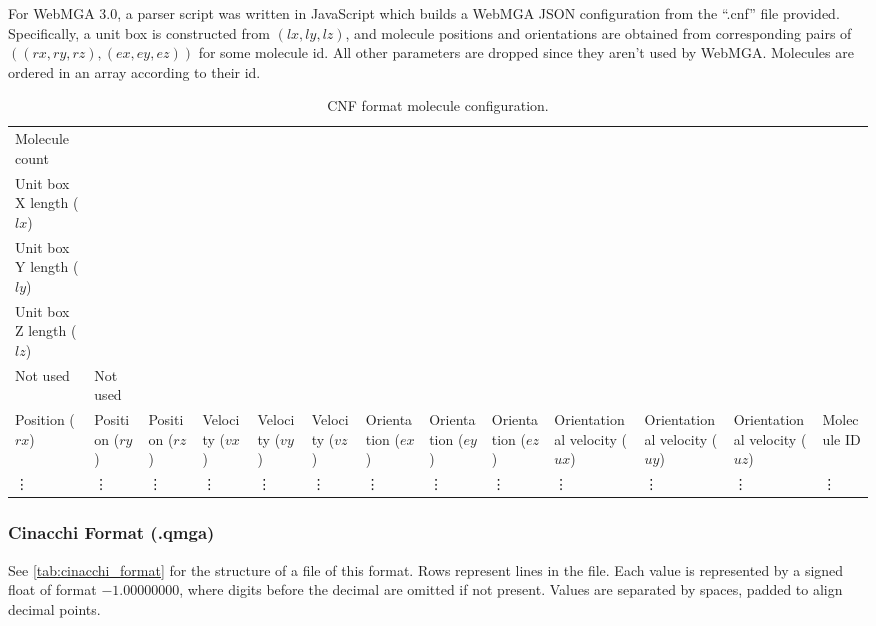 For WebMGA 3.0, a parser script was written in JavaScript which builds a WebMGA JSON configuration from the ``.cnf'' file provided. Specifically, a unit box is constructed from $(lx, ly, lz)$, and molecule positions and orientations are obtained from corresponding pairs of $((rx,ry,rz),(ex,ey,ez))$ for some molecule id. All other parameters are dropped since they aren't used by WebMGA. Molecules are ordered in an array according to their id.
\begin{table}
  \begin{center}
  \begin{adjustbox}{width=\textwidth}
    \begin{tabular}{lllllllllllll}
      \hline\hline
      Molecule count & & & & & & & & & & & &\\
      Unit box X length ($lx$) & & & & & & & & & & & &\\
      Unit box Y length ($ly$) & & & & & & & & & & & &\\
      Unit box Z length ($lz$) & & & & & & & & & & & &\\
      Not used & Not used & & & & & & & & & & &\\
      Position ($rx$) & Position ($ry$) & Position ($rz$) & Velocity ($vx$) & Velocity ($vy$) & Velocity ($vz$) & Orientation ($ex$) & Orientation ($ey$) & Orientation ($ez$) & Orientational velocity ($ux$) & Orientational velocity ($uy$) & Orientational velocity ($uz$) & Molecule ID\\
      \vdots & \vdots & \vdots & \vdots & \vdots & \vdots & \vdots & \vdots & \vdots & \vdots & \vdots & \vdots & \vdots \\
       \hline\hline
    \end{tabular}
  \end{adjustbox}
  \end{center}
  \caption{CNF format molecule configuration.}
  \label{tab:lammps_format}
\end{table}

\subsubsection{Cinacchi Format (.qmga)}
See \cref{tab:cinacchi_format} for the structure of a file of this format. Rows represent lines in the file. Each value is represented by a signed float of format $-1.00000000$, where digits before the decimal are omitted if not present. Values are separated by spaces, padded to align decimal points.

